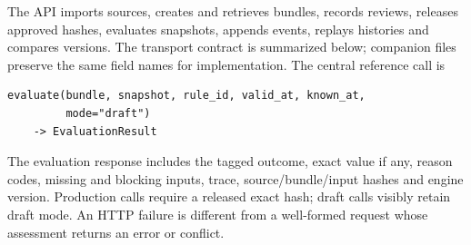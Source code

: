 \documentclass[12pt,a4paper,oneside,openany]{book}
\begin{document}
\label{merge:P-03c-storage-review:02}


The API imports sources, creates and retrieves bundles, records reviews, releases
approved hashes, evaluates snapshots, appends events, replays histories and
compares versions. The transport contract is summarized below; companion files
preserve the same field names for implementation. The central reference call is

\begin{minipage}{\textwidth}
\begin{lstlisting}
evaluate(bundle, snapshot, rule_id, valid_at, known_at,
         mode="draft")
    -> EvaluationResult
\end{lstlisting}
\end{minipage}

The evaluation response includes the tagged outcome, exact value if any, reason codes,
missing and blocking inputs, trace, source/bundle/input hashes and engine version.
Production calls require a released exact hash; draft calls visibly retain draft
mode. An HTTP failure is different from a well-formed request whose assessment
returns an error or conflict.
\end{document}
